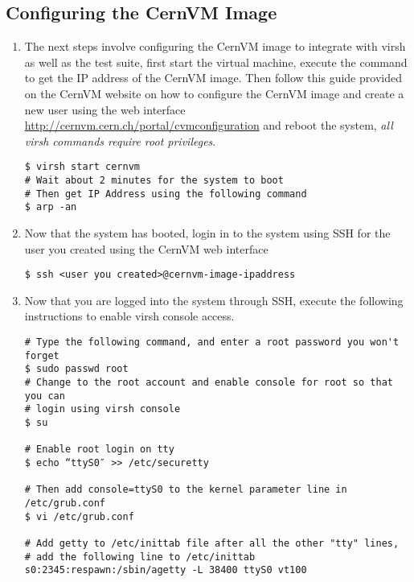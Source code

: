 \subsection{Configuring the CernVM Image}
\label{sec:rhcernvmconfig}
\begin{enumerate}
\item 	The next steps involve configuring the CernVM image to integrate with virsh as well as the test suite, first
		start the virtual machine, execute the command to get the IP address of the CernVM image. Then follow this guide
		provided on the CernVM website on how to configure the CernVM image and create a new user using the web interface 
		\url{http://cernvm.cern.ch/portal/cvmconfiguration} and reboot the system, \emph{all virsh commands require root 
		privileges}.
		
\begin{lstlisting}
$ virsh start cernvm
# Wait about 2 minutes for the system to boot 
# Then get IP Address using the following command
$ arp -an
\end{lstlisting}

\item 	Now that the system has booted, login in to the system using SSH for the user you created using the CernVM web interface
\begin{lstlisting}
$ ssh <user you created>@cernvm-image-ipaddress
\end{lstlisting}

\item	Now that you are logged into the system through SSH, execute the following instructions to enable virsh console access.
		
\lstset{language=bash,caption=Enable Virsh Console Access}
\begin{lstlisting}
# Type the following command, and enter a root password you won't forget
$ sudo passwd root
# Change to the root account and enable console for root so that you can 
# login using virsh console
$ su

# Enable root login on tty
$ echo “ttyS0″ >> /etc/securetty

# Then add console=ttyS0 to the kernel parameter line in /etc/grub.conf
$ vi /etc/grub.conf

# Add getty to /etc/inittab file after all the other "tty" lines, 
# add the following line to /etc/inittab
s0:2345:respawn:/sbin/agetty -L 38400 ttyS0 vt100

\end{lstlisting}


\end{enumerate}
